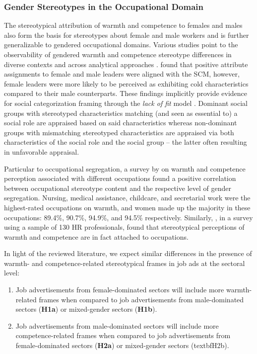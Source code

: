 \documentclass[man]{apa7}
\begin{document}
\subsubsection{Gender Stereotypes in the Occupational Domain}
The stereotypical attribution of warmth and competence to females and males also form the basis for stereotypes about female and male workers \parencite{froehlich_gender_2020} and is further generalizable to gendered occupational domains. Various studies point to the observability of gendered warmth and competence stereotype differences in diverse contexts and across analytical approaches \parencite{aaldering_political_2020, harmer_are_2017}. \Textcite{smith_power_2019} found that positive attribute assignments to female and male leaders were aligned with the SCM, however, female leaders were more likely to be perceived as exhibiting cold characteristics compared to their male counterparts. These findings implicitly provide evidence for social categorization framing through the \textit{lack of fit} model \parencite[see][]{heilman_gender_2012, horvath_reducing_2016}. Dominant social groups with stereotyped characteristics matching (and seen as essential to) a social role are appraised based on said characteristics whereas non-dominant groups with mismatching stereotyped characteristics are appraised via both characteristics of the social role and the social group – the latter often resulting in unfavorable appraisal.

Particular to occupational segregation, a survey by \Textcite{he_stereotypes_2019} on warmth and competence perception associated with different occupations found a positive correlation between occupational stereotype content and the respective level of gender segregation. Nursing, medical assistance, childcare, and secretarial work were the highest-rated occupations on warmth, and women made up the majority in these occupations: 89.4\%, 90.7\%, 94.9\%, and 94.5\% respectively. Similarly, \Textcite{strinic_occupational_2021}, in a survey using a sample of 130 HR professionals, found that stereotypical perceptions of warmth and competence are in fact attached to occupations.

In light of the reviewed literature, we expect similar differences in the presence of warmth- and competence-related stereotypical frames in job ads at the sectoral level:

\begin{enumerate}[align=left, label={\textbf{Hypothesis \arabic*:}}]

\item Job advertisements from female-dominated sectors will include more warmth-related frames when compared to job advertisements from male-dominated sectors (\textbf{H1a}) or mixed-gender sectors (\textbf{H1b}).

\item Job advertisements from male-dominated sectors will include more competence-related frames when compared to job advertisements from female-dominated sectors (\textbf{H2a}) or mixed-gender sectors (textbf{H2b}).

\end{enumerate}
\end{document}

